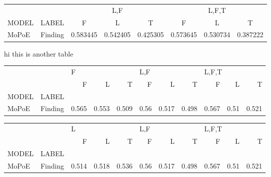 \begin{table}[]
    \centering


\begin{small}
    \begin{sc}
\begin{tabular}{lccccccc}
      &         & \multicolumn{3}{c}{L,F} & \multicolumn{3}{c}{L,F,T} \\
    \cmidrule(l){3-5} \cmidrule(l){6-8}
     MODEL &    LABEL     &         F &         L &         T &         F &         L &         T \\

\midrule
MoPoE & Finding &  0.583445 &  0.542405 &  0.425305 &  0.573645 &  0.530734 &  0.387222 \\

\end{tabular}
    \end{sc}
\end{small}
\end{table}

hi this is another table


\begin{tabular}{llrrrrrrrrr}
\toprule
      &         & \multicolumn{3}{l}{F} & \multicolumn{3}{l}{L,F} & \multicolumn{3}{l}{L,F,T} \\
      &         &      F &      L &      T &     F &      L &      T &      F &     L &      T \\
MODEL & LABEL &        &        &        &       &        &        &        &       &        \\
\midrule
MoPoE & Finding &  0.565 &  0.553 &  0.509 &  0.56 &  0.517 &  0.498 &  0.567 &  0.51 &  0.521 \\
\bottomrule
\end{tabular}

\begin{tabular}{llrrrrrrrrr}
\toprule
      &         & \multicolumn{3}{l}{L} & \multicolumn{3}{l}{L,F} & \multicolumn{3}{l}{L,F,T} \\
      &         &      F &      L &      T &     F &      L &      T &      F &     L &      T \\
MODEL & LABEL &        &        &        &       &        &        &        &       &        \\
\midrule
MoPoE & Finding &  0.514 &  0.518 &  0.536 &  0.56 &  0.517 &  0.498 &  0.567 &  0.51 &  0.521 \\
\bottomrule
\end{tabular}

